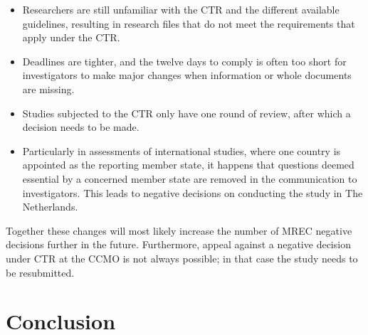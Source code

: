 \documentclass[authordate, meta]{jote-new-article}
\begin{document}
\begin{itemize}


  \item Researchers are still unfamiliar with the CTR and the different available guidelines, resulting in research files that do not meet the requirements that apply under the CTR.



  \item
        Deadlines are tighter, and the twelve days to comply is often too short for investigators to make major changes when information or whole documents are missing.



  \item Studies subjected to the CTR only have one round of review, after which a decision needs to be made.



  \item
        Particularly in assessments of international studies, where one country is appointed as the reporting member state, it happens that questions deemed essential by a concerned member state are removed in the communication to investigators. This leads to negative decisions on conducting the study in The Netherlands.


\end{itemize}
\newpage
Together these changes will most likely increase the number of MREC negative decisions further in the future. Furthermore, appeal against a negative decision under CTR at the CCMO is not always possible; in that case the study needs to be resubmitted.







\section{Conclusion}
\end{document}
